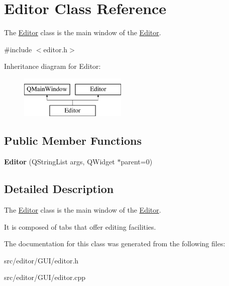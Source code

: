 \hypertarget{class_editor}{}\section{Editor Class Reference}
\label{class_editor}


The \hyperlink{class_editor}{Editor} class is the main window of the \hyperlink{class_editor}{Editor}.  




{\ttfamily \#include $<$editor.\+h$>$}

Inheritance diagram for Editor\+:\begin{figure}[H]
\begin{center}
\leavevmode
\includegraphics[height=2.000000cm]{class_editor}
\end{center}
\end{figure}
\subsection*{Public Member Functions}
\begin{DoxyCompactItemize}
\item 
\hypertarget{class_editor_a7332320d22be46fb91bf0471dac0279b}{}\label{class_editor_a7332320d22be46fb91bf0471dac0279b} 
{\bfseries Editor} (Q\+String\+List args, Q\+Widget $\ast$parent=0)
\end{DoxyCompactItemize}


\subsection{Detailed Description}
The \hyperlink{class_editor}{Editor} class is the main window of the \hyperlink{class_editor}{Editor}. 

It is composed of tabs that offer editing facilities. 

The documentation for this class was generated from the following files\+:\begin{DoxyCompactItemize}
\item 
src/editor/\+G\+U\+I/editor.\+h\item 
src/editor/\+G\+U\+I/editor.\+cpp\end{DoxyCompactItemize}
